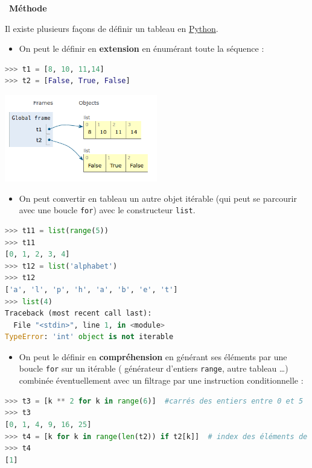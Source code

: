 \documentclass[
  11pt,
]{article}
\newcommand{\passthrough}[1]{#1}
\providecommand{\tightlist}{%
  \setlength{\itemsep}{0pt}\setlength{\parskip}{0pt}}
\newenvironment{methode}[1]
{\par \medskip    \noindent  
 \begin {bclogo}[arrondi =0.1,logo=\bcoutil, marge=4,noborder = true] {~\textbf{Méthode}   {\itshape #1} }  \par}
{
\end{bclogo}
 \par \bigskip }
\begin{document}
\begin{methode}{}

Il existe plusieurs façons de définir un tableau en
\href{https://docs.python.org/3/tutorial/datastructures.html}{Python}.

\begin{itemize}
\tightlist
\item
  On peut le définir en \textbf{extension} en énumérant toute la
  séquence :
\end{itemize}

\begin{lstlisting}[language=Python]
>>> t1 = [8, 10, 11,14]
>>> t2 = [False, True, False]
\end{lstlisting}

\includegraphics[width=0.5\textwidth,height=\textheight]{images/tableau1.png}\\

\begin{itemize}
\tightlist
\item
  On peut convertir en tableau un autre objet itérable (qui peut se
  parcourir avec une boucle \passthrough{\lstinline!for!}) avec le
  constructeur \passthrough{\lstinline!list!}.
\end{itemize}

\begin{lstlisting}[language=Python]
>>> t11 = list(range(5))
>>> t11
[0, 1, 2, 3, 4]
>>> t12 = list('alphabet')
>>> t12
['a', 'l', 'p', 'h', 'a', 'b', 'e', 't']
>>> list(4)
Traceback (most recent call last):
  File "<stdin>", line 1, in <module>
TypeError: 'int' object is not iterable
\end{lstlisting}

\begin{itemize}
\tightlist
\item
  On peut le définir en \textbf{compréhension} en générant ses éléments
  par une boucle \passthrough{\lstinline!for!} sur un itérable (
  générateur d'entiers \passthrough{\lstinline!range!}, autre tableau
  \ldots) combinée éventuellement avec un filtrage par une instruction
  conditionnelle :
\end{itemize}

\begin{lstlisting}[language=Python]
>>> t3 = [k ** 2 for k in range(6)]  #carrés des entiers entre 0 et 5
>>> t3
[0, 1, 4, 9, 16, 25]
>>> t4 = [k for k in range(len(t2)) if t2[k]]  # index des éléments de t2 de valeur True
>>> t4
[1]
\end{lstlisting}

\end{methode}
\end{document}
